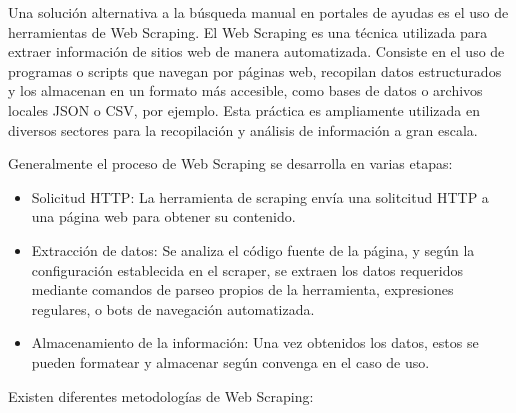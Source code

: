 Una solución alternativa a la búsqueda manual en portales de ayudas es el uso de herramientas de Web Scraping.
El Web Scraping \cite{inbook} es una técnica utilizada para extraer información de sitios web de manera automatizada. Consiste en el uso de programas o scripts que navegan por páginas web, recopilan datos estructurados y los almacenan en un formato más accesible, como bases de datos o archivos locales JSON o CSV, por ejemplo. Esta práctica es ampliamente utilizada en diversos sectores para la recopilación y análisis de información a gran escala.

Generalmente el proceso de Web Scraping se desarrolla en varias etapas:

\begin{itemize}
    \item Solicitud HTTP: La herramienta de scraping envía una solitcitud HTTP a una página web para obtener su contenido.
    \item Extracción de datos: Se analiza el código fuente de la página, y según la configuración establecida en el scraper, se extraen los datos requeridos mediante comandos de parseo propios de la herramienta, expresiones regulares, o bots de navegación automatizada.
    \item Almacenamiento de la información: Una vez obtenidos los datos, estos se pueden formatear y almacenar según convenga en el caso de uso. 
\end{itemize}

Existen diferentes metodologías de Web Scraping:

